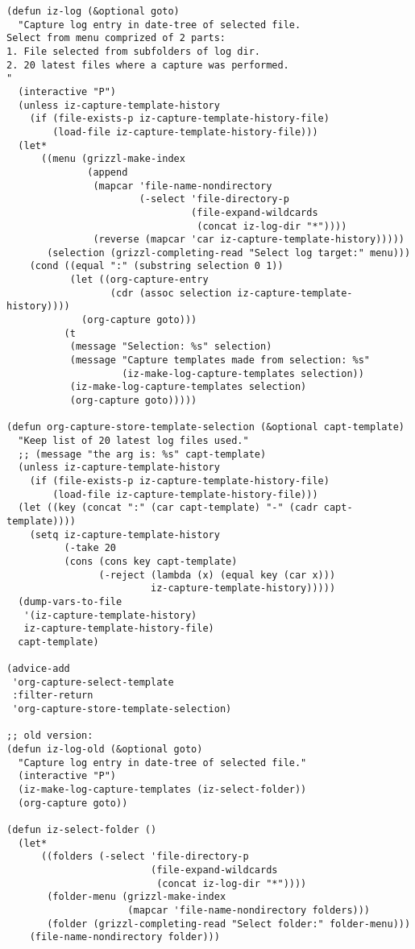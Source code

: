 \documentclass{article}
\begin{document}
\begin{verbatim}
(defun iz-log (&optional goto)
  "Capture log entry in date-tree of selected file.
Select from menu comprized of 2 parts:
1. File selected from subfolders of log dir.
2. 20 latest files where a capture was performed.
"
  (interactive "P")
  (unless iz-capture-template-history
    (if (file-exists-p iz-capture-template-history-file)
        (load-file iz-capture-template-history-file)))
  (let*
      ((menu (grizzl-make-index
              (append
               (mapcar 'file-name-nondirectory
                       (-select 'file-directory-p
                                (file-expand-wildcards
                                 (concat iz-log-dir "*"))))
               (reverse (mapcar 'car iz-capture-template-history)))))
       (selection (grizzl-completing-read "Select log target:" menu)))
    (cond ((equal ":" (substring selection 0 1))
           (let ((org-capture-entry
                  (cdr (assoc selection iz-capture-template-history))))
             (org-capture goto)))
          (t
           (message "Selection: %s" selection)
           (message "Capture templates made from selection: %s"
                    (iz-make-log-capture-templates selection))
           (iz-make-log-capture-templates selection)
           (org-capture goto)))))

(defun org-capture-store-template-selection (&optional capt-template)
  "Keep list of 20 latest log files used."
  ;; (message "the arg is: %s" capt-template)
  (unless iz-capture-template-history
    (if (file-exists-p iz-capture-template-history-file)
        (load-file iz-capture-template-history-file)))
  (let ((key (concat ":" (car capt-template) "-" (cadr capt-template))))
    (setq iz-capture-template-history
          (-take 20
          (cons (cons key capt-template)
                (-reject (lambda (x) (equal key (car x)))
                         iz-capture-template-history)))))
  (dump-vars-to-file
   '(iz-capture-template-history)
   iz-capture-template-history-file)
  capt-template)

(advice-add
 'org-capture-select-template
 :filter-return
 'org-capture-store-template-selection)

;; old version:
(defun iz-log-old (&optional goto)
  "Capture log entry in date-tree of selected file."
  (interactive "P")
  (iz-make-log-capture-templates (iz-select-folder))
  (org-capture goto))

(defun iz-select-folder ()
  (let*
      ((folders (-select 'file-directory-p
                         (file-expand-wildcards
                          (concat iz-log-dir "*"))))
       (folder-menu (grizzl-make-index
                     (mapcar 'file-name-nondirectory folders)))
       (folder (grizzl-completing-read "Select folder:" folder-menu)))
    (file-name-nondirectory folder)))


\end{verbatim}
\end{document}
